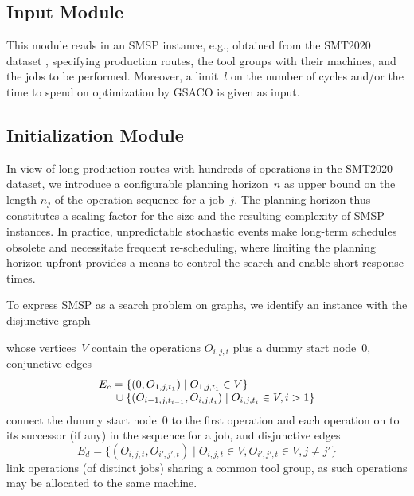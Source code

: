 \documentclass[runningheads]{llncs}
\begin{document}
\subsection{Input Module}

This module reads in an SMSP instance, e.g.,
obtained from the SMT2020 dataset \cite{kopp2020smt2020},
specifying production routes,
the tool groups with their machines, and the jobs to be performed.
Moreover, a limit~$l$ on the number of cycles and/or the time to spend
on optimization by GSACO is given as input.

\subsection{Initialization Module}
\label{subsec:initialization}
In view of long production routes with hundreds of operations
in the SMT2020 dataset, we introduce a configurable planning horizon~$n$
as upper bound on the length $n_j$ of the operation sequence for a job~$j$.
The planning horizon thus constitutes a scaling factor for the size and
the resulting complexity of SMSP instances.
In practice, unpredictable stochastic events make long-term schedules obsolete and necessitate frequent re-scheduling,
where limiting the planning horizon upfront provides a means to
control the search and enable short response times.

To express SMSP as a search problem on graphs,
we identify an instance with the disjunctive graph

whose vertices~$V$ contain the operations $O_{i,j,t}$ plus
a dummy start node~$0$,
conjunctive edges\linebreak[1]%
%
\begin{equation}
	\begin{array}{@{}r@{}l@{}}
		E_c = {}
		& \{(0,O_{1,j,t_1}) \mid O_{1,j,t_1}\in V\}
		\\ {} \cup {}
		& \{(O_{i-1,j,t_{i-1}},O_{i,j,t_i}) \mid O_{i,j,t_i}\in V, i > 1\}
	\end{array}
\end{equation}
%
connect the dummy start node~$0$ to the first operation
and each operation on to its successor (if any) in the sequence for a job,
and disjunctive edges\linebreak[1]%
%
\begin{equation}
	E_d = \{(O_{i,j,t},O_{i',j',t}) \mid O_{i,j,t}\in V,O_{i',j',t}\in V, j\neq j'\}
\end{equation}
%
link operations (of distinct jobs) sharing a common tool group,
as such operations may be allocated to the same machine.
\end{document}

